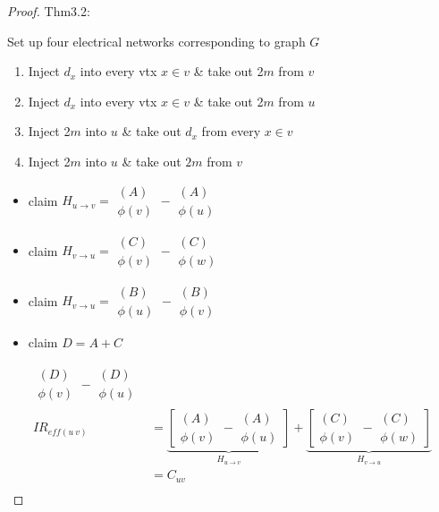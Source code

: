 \documentclass[12pt]{article}
\begin{document}
\begin{proof}
	Thm3.2:
	
	Set up four electrical networks corresponding to graph $G$
\begin{enumerate}[label=(\Alph*)]
	\item Inject $d_x$ into every vtx $x \in v$ \& take out 2$m$ from $v$
	\item Inject $d_x$ into every vtx $x \in v$ \& take out 2$m$ from $u$
	\item Inject 2$m$ into $u$ \& take out $d_x$ from every $x\in v$
	\item Inject 2$m$ into $u$ \& take out $2m$ from $v$
\end{enumerate}
\begin{itemize}
	\item claim $H_{u \to v} = \begin{matrix}(A)\\\phi(v)\end{matrix} - \begin{matrix}(A)\\\phi(u)\end{matrix}$
	\item claim $H_{v \to u} = \begin{matrix}(C)\\\phi(v)\end{matrix} - \begin{matrix}(C)\\\phi(w)\end{matrix}$
	\item claim $H_{v \to u} = \begin{matrix}(B)\\\phi(u)\end{matrix} - \begin{matrix}(B)\\\phi(v)\end{matrix}$
	\item claim $D = A+C$
\end{itemize}
\begin{align*}
	\begin{matrix}(D)\\\phi(v)\end{matrix} - \begin{matrix}(D)\\\phi(u)\end{matrix}\\
		IR_{eff(u~v)} &=\underbrace{[\begin{matrix}(A)\\\phi(v)\end{matrix} - \begin{matrix}(A)\\\phi(u)\end{matrix}]}_{H_{u \to v}} + \underbrace{[\begin{matrix}(C)\\\phi(v)\end{matrix} - \begin{matrix}(C)\\\phi(w)\end{matrix}]}_{H_{v \to u}}\\
	&=C_{uv}\\
\end{align*}
\end{proof}
\end{document}
